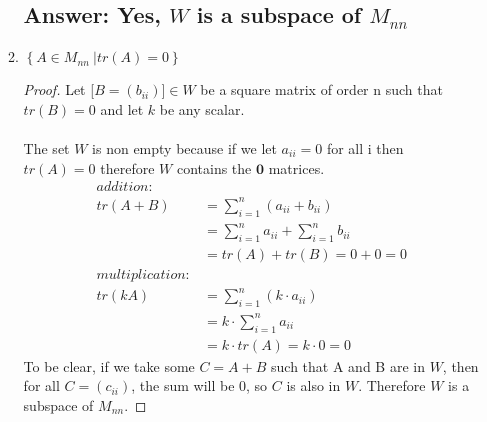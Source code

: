 \documentclass[12pt]{article}
\newcommand{\DS} [1] {${\displaystyle #1}$}
\begin{document}
\begin{enumerate}
\begin{enumerate}
                            \subsection{Answer: Yes, $W$ is a subspace of $M_{nn}$}
                      \item \DS{ \left\{A \in{M_{nn}} \ | tr (A) = 0 \right\}}
                            \begin{proof}
                                    Let [$B = ({b_{ii}})]\in W$ be a square matrix of order n such that $tr(B)=0$ and let ${k}$ be any scalar.\\\\
                                    The set $W$ is non empty because if we let ${a_{ii}=0}$
                                    for all i then $tr(A)=0$ therefore $W$ contains the $\mathbf{0}$ matrices.
                                    \begin{align*}
                                            addition:       &                                                   \\
                                            tr(A+B)         & = \sum_{i = 1}^{n}(a_{ii}+b_{ii})                 \\
                                                            & = \sum_{i = 1}^{n}a_{ii} + \sum_{i = 1}^{n}b_{ii} \\
                                                            & = tr(A) + tr(B) = 0 + 0 = 0                       \\
                                            multiplication: &                                                   \\
                                            tr(kA)          & = \sum_{i = 1}^{n}(k\cdot a_{ii})                 \\
                                                            & = k\cdot \sum_{i = 1}^{n}a_{ii}                   \\
                                                            & = k\cdot tr(A) = k\cdot 0 = 0
                                    \end{align*}
                                    To be clear, if we take some $C = A+B$ such that A and B are in $W$,
                                    then for all $C = (c_{ii})$, the sum will be $0$, so $C$ is also in $W$.
                                    Therefore $W$ is a subspace of $M_{nn}$.
                            \end{proof}
                            \pagebreak

\end{enumerate}
\end{enumerate}
\end{document}
